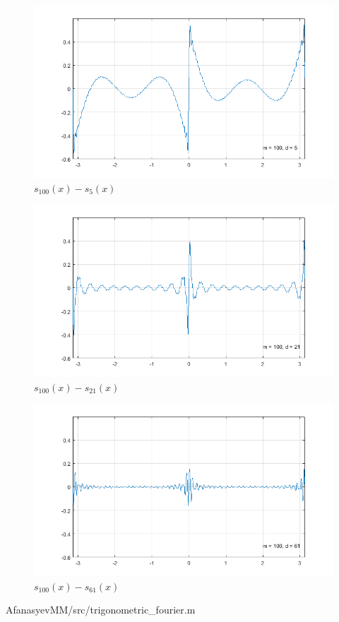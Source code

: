 \begin{figure}[H]
	\centering
	\includegraphics[width=0.5\linewidth]{AfanasyevMM/img/s(x)_m100_d5}
	\caption{$s_{100}(x) - s_{5}(x)$}
	\label{fig:AfanasyevMM.s(x)_m100_d5}
\end{figure}
\begin{figure}[H]
	\centering
	\includegraphics[width=0.5\linewidth]{AfanasyevMM/img/s(x)_m100_d21}
	\caption{$s_{100}(x) - s_{21}(x)$}
	\label{fig:AfanasyevMM.s(x)_m100_d21}
\end{figure}
\begin{figure}[H]
	\centering
	\includegraphics[width=0.5\linewidth]{AfanasyevMM/img/s(x)_m100_d61}
	\caption{$s_{100}(x) - s_{61}(x)$}
	\label{fig:AfanasyevMM.s(x)_m100_d61}
\end{figure}
\lstset{language=Matlab,
        basicstyle=\small}

{AfanasyevMM/src/trigonometric_fourier.m}
\newpage